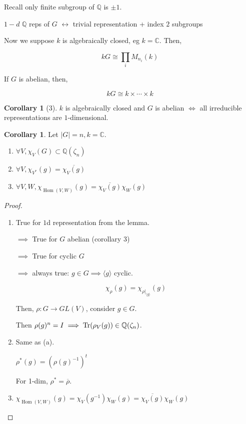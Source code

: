 \documentclass{article}
\theoremstyle{definition}
\newtheorem{corollary}[theorem]{Corollary}
\newcommand{\Hom}{\operatorname{Hom}}
\begin{document}
Recall only finite subgroup of \(\mathbb{Q}\) is \(\pm 1\).

\(1-d\) \(\mathbb{Q}\) reps of \(G\) \(\leftrightarrow\) trivial representation + index \(2\) subgroups

Now we suppose \(k\) is algebraically closed, eg \(k = \mathbb{C}\). Then,

\[
    kG \cong \prod_i M_{n_i}(k)
\]

If \(G\) is abelian, then,

\[
    kG \cong k \times \cdots \times k
\]

\begin{corollary}
    [3] \(k\) is algebraically closed and \(G\) is abelian \(\iff\) all irreducible representations are \(1\)-dimensional. 
\end{corollary}

\begin{corollary}
    Let \(\vert G \vert = n, k = \mathbb{C}\). 

    \begin{enumerate}[label=\alph*)]
        \item \(\forall V, \chi_V(G) \subset \mathbb{Q} (\zeta_n)\) 
        \item \(\forall V, \chi_{V^{\ast}}(g) = \overline{\chi_V(g)} \)
        \item \(\forall V, W, \chi_{\Hom(V,W)} (g) = \overline{\chi_V(g)} \chi_W(g)\)   
    \end{enumerate} 
\end{corollary}

\begin{proof}
    \begin{enumerate}[label=\alph*)]
        \item True for \(1\)d representation from the lemma.
        
        \(\implies\) True for \(G\) abelian (corollary 3)

        \(\implies\) True for cyclic \(G\)

        \(\implies\) always true: \(g\in G \implies \langle g \rangle \) cyclic.

        \[
            \chi_{\rho}(g) = \chi_{\rho|_{\langle g \rangle }} (g) 
        \]

        Then, \(\rho : G \to GL(V)\), consider \(g\in G\).
        
        Then \(\rho(g)^n = I \implies \Tr(\rho_V(g)) \in \mathbb{Q}(\zeta_n)\).
        
        \item Same as (a). 
        
        \(\rho ^{\ast} (g) = (\rho (g)^{-1})^t\) 
        
        For 1-dim, \(\rho ^{\ast} = \overline{\rho}\).

        \item \(\chi_{\Hom(V,W)}(g) = \chi_V(g ^{-1}) \chi_W(g) = \overline{\chi_V(g)} \chi_W(g)\) 
    \end{enumerate} 
\end{proof}
\end{document}
